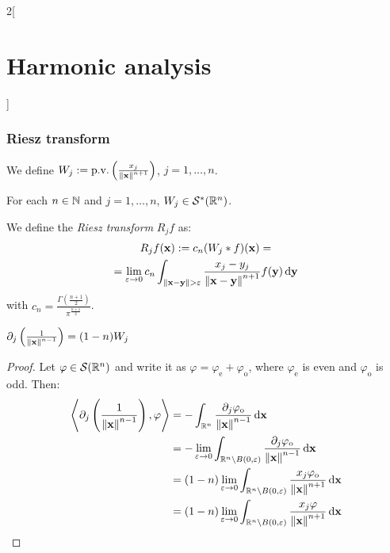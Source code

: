 \documentclass[../../../main_math.tex]{subfiles}
\begin{document}
\begin{multicols}{2}[\section{Harmonic analysis}]
  \subsubsection{Riesz transform}
  \begin{definition}
    We define $W_j:=\mathrm{p.v.}\left(\frac{x_j}{\left\|\boldsymbol{\mathrm{x}}\right\|^{n+1}}\right)$, $j=1,\ldots,n$.
  \end{definition}
  \begin{lemma}
    For each $n\in\mathbb{N}$ and $j=1,\ldots,n$, $W_j\in\mathcal{S}^*(\mathbb{R}^n)$.
  \end{lemma}
  \begin{definition}
    We define the \emph{Riesz transform} $R_jf$ as:
    \begin{multline*}
      R_jf(\boldsymbol{\mathrm{x}}):=c_n(W_j*f)(\boldsymbol{\mathrm{x}})=\\=\lim_{\varepsilon\to 0}c_n\int_{\left\|\boldsymbol{\mathrm{x}}-\boldsymbol{\mathrm{y}}\right\| > \varepsilon}\frac{x_j-y_j}{\left\|\boldsymbol{\mathrm{x}}-\boldsymbol{\mathrm{y}}\right\|^{n+1}}f(\boldsymbol{\mathrm{y}})\dd{\boldsymbol{\mathrm{y}}}
    \end{multline*}
    with $c_n=\frac{\Gamma\left(\frac{n+1}{2}\right)}{\pi^{\frac{n+1}{2}}}$.
  \end{definition}
  \begin{lemma}\label{lem:preRiesz1}
    $\partial_j\left(\frac{1}{\left\|\boldsymbol{\mathrm{x}}\right\|^{n-1}}\right)=(1-n)W_j$
  \end{lemma}
  \begin{proof}
    Let $\varphi\in\mathcal{S}(\mathbb{R}^n)$ and write it as $\varphi=\varphi_\mathrm{e}+\varphi_\mathrm{o}$, where $\varphi_\mathrm{e}$ is even and $\varphi_\mathrm{o}$ is odd. Then:
    \begin{align*}
      \left\langle \partial_j\left(\frac{1}{\norm{\vf{x}}^{n-1}}\right),\varphi\right\rangle & = -\int_{\RR^n} \frac{\partial_j\varphi_\mathrm{o}}{\norm{\vf{x}}^{n-1}}\dd{\vf{x}}                                                   \\
                                                                                             & =-\lim_{\varepsilon \to 0}\int_{\RR^n\setminus B(0,\varepsilon)} \frac{\partial_j\varphi_\mathrm{o}}{\norm{\vf{x}}^{n-1}} \dd{\vf{x}} \\
                                                                                             & = (1-n)\lim_{\varepsilon \to 0}\int_{\RR^n\setminus B(0,\varepsilon)} \frac{x_j\varphi_\mathrm{o}}{\norm{\vf{x}}^{n+1}} \dd{\vf{x}}   \\
                                                                                             & = (1-n)\lim_{\varepsilon \to 0}\int_{\RR^n\setminus B(0,\varepsilon)} \frac{x_j\varphi}{\norm{\vf{x}}^{n+1}} \dd{\vf{x}}

\end{align*}
\end{proof}
\end{multicols}
\end{document}
